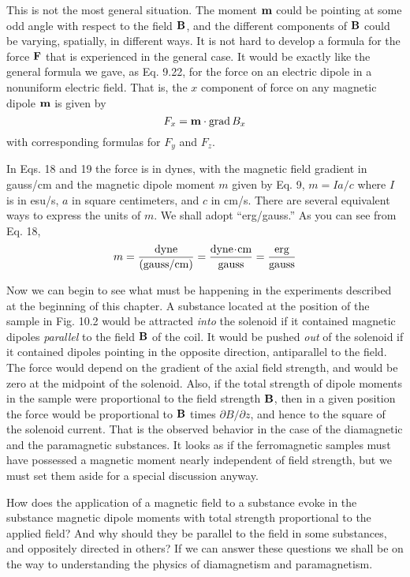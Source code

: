 
This is not the most general situation. The
moment $\mathbf{m}$ could be pointing at some odd angle with respect to the
field $\mathbf{B}$, and the different components of $\mathbf{B}$ could be varying, spatially,
in different ways. It is not hard to develop a formula for the force $\mathbf{F}$
that is experienced in the general case. It would be exactly like the
general formula we gave, as Eq. 9.22, for the force on an electric
dipole in a nonuniform electric field. That is, the $x$ component of
force on any magnetic dipole $\mathbf{m}$ is given by
\begin{equation}
  F_x = \mathbf{m}\cdot\operatorname{grad} B_x
\end{equation}
with corresponding formulas for $F_y$ and $F_z$.

In Eqs. 18 and 19 the force is in dynes, with the magnetic field
gradient in gauss/cm and the magnetic dipole moment $m$ given by
Eq. 9, $m = Ia/c$ where $I$ is in esu/s, $a$ in square centimeters, and $c$
in cm/s. There are several equivalent ways to express the units
of $m$. We shall adopt ``erg/gauss.'' As you can see from Eq. 18,
\begin{equation}
  m = \frac{\text{dyne}}{(\text{gauss}/\textup{cm})}
    = \frac{\text{dyne}\!\cdot\!\textup{cm}}{\text{gauss}}
    = \frac{\text{erg}}{\text{gauss}}
\end{equation}

Now we can begin to see what must be happening in the experiments
described at the beginning of this chapter. A substance
located at the position of the sample in Fig. 10.2 would be attracted
\emph{into} the solenoid if it contained magnetic dipoles \emph{parallel} to the field
$\mathbf{B}$ of the coil. It would be pushed \emph{out} of the solenoid if it contained
dipoles pointing in the opposite direction, antiparallel to the field.
The force would depend on the gradient of the axial field strength,
and would be zero at the midpoint of the solenoid. Also, if the total
strength of dipole moments in the sample were proportional to the
field strength $\mathbf{B}$, then in a given position the force would be proportional
to $\mathbf{B}$ times $\partial B/\partial z$, and hence to the square of the solenoid 
current. That is the observed behavior in the case of the diamagnetic
and the paramagnetic substances. It looks as if the ferromagnetic
samples must have possessed a magnetic moment nearly independent
of field strength, but we must set them aside for a special discussion
anyway.

How does the application of a magnetic field to a substance evoke
in the substance magnetic dipole moments with total strength proportional
to the applied field? And why should they be parallel to
the field in some substances, and oppositely directed in others? If
we can answer these questions we shall be on the way to understanding
the physics of diamagnetism and paramagnetism.

